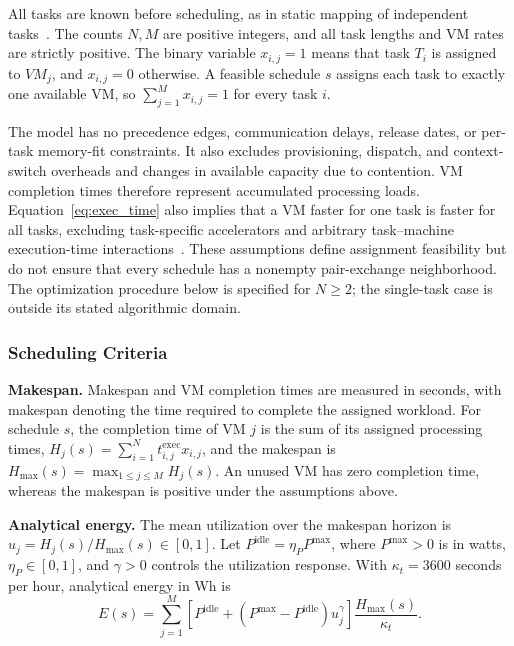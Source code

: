 \documentclass[pdflatex,onecolumn,sn-mathphys-num]{sn-jnl}
\begin{document}
All tasks are known before scheduling, as in static mapping of independent tasks~\cite{Braun2001}. The counts $N,M$ are positive integers, and all task lengths and VM rates are strictly positive. The binary variable $x_{i,j}=1$ means that task $T_i$ is assigned to $VM_j$, and $x_{i,j}=0$ otherwise. A feasible schedule $s$ assigns each task to exactly one available VM, so $\sum_{j=1}^{M}x_{i,j}=1$ for every task $i$.

The model has no precedence edges, communication delays, release dates, or per-task memory-fit constraints. It also excludes provisioning, dispatch, and context-switch overheads and changes in available capacity due to contention. VM completion times therefore represent accumulated processing loads. Equation~\eqref{eq:exec_time} also implies that a VM faster for one task is faster for all tasks, excluding task-specific accelerators and arbitrary task--machine execution-time interactions~\cite{Braun2001}. These assumptions define assignment feasibility but do not ensure that every schedule has a nonempty pair-exchange neighborhood. The optimization procedure below is specified for $N\geq2$; the single-task case is outside its stated algorithmic domain.

\subsubsection{Scheduling Criteria}\label{sec4}
\textbf{Makespan.}
Makespan and VM completion times are measured in seconds, with makespan denoting the time required to complete the assigned workload. For schedule $s$, the completion time of VM $j$ is the sum of its assigned processing times, $H_j(s)=\sum_{i=1}^{N}t^{\mathrm{exec}}_{i,j}x_{i,j}$, and the makespan is $H_{\mathrm{max}}(s)=\max_{1\leq j\leq M}H_j(s)$. An unused VM has zero completion time, whereas the makespan is positive under the assumptions above.

\begin{samepage}
\textbf{Analytical energy.}
The mean utilization over the makespan horizon is $u_j=H_j(s)/H_{\mathrm{max}}(s)\in[0,1]$. Let $P^{\mathrm{idle}}=\eta_P P^{\mathrm{max}}$, where $P^{\mathrm{max}}>0$ is in watts, $\eta_P\in[0,1]$, and $\gamma>0$ controls the utilization response. With $\kappa_t=3600$ seconds per hour, analytical energy in Wh is
\begin{equation}\label{eq:energy}
E(s)=\sum_{j=1}^{M}\left[P^{\mathrm{idle}}+(P^{\mathrm{max}}-P^{\mathrm{idle}})u_j^{\gamma}\right]\frac{H_{\mathrm{max}}(s)}{\kappa_t}.
\end{equation}
\end{samepage}
\end{document}
